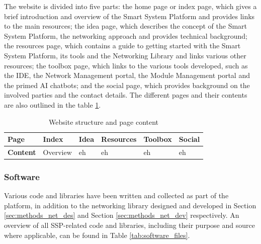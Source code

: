 The website is divided into five parts: the home page or index page, which gives a brief introduction and overview of the Smart System Platform and provides links to the main resources; the idea page, which describes the concept of the Smart System Platform, the networking approach and provides technical background; the resources page, which contains a guide to getting started with the Smart System Platform, its tools and the Networking Library and links various other resources; the toolbox page, which links to the various tools developed, such as the IDE, the Network Management portal, the Module Management portal and the primed AI chatbots; and the social page, which provides background on the involved parties and the contact details. The different pages and their contents are also outlined in the table \ref{tab:website_content}.

\begin{table}[H]
    \centering
    \begin{tabular}{|l||p{70pt}|p{70pt}|p{70pt}|p{70pt}|p{70pt}|}
        \hline
        \textbf{Page} & Index & Idea & Resources & Toolbox & Social \\\hline
        \textbf{Content} & Overview & eh & eh & eh & eh \\
    \end{tabular}
    \vspace{\ftspace}
    \caption{Website structure and page content}
    \label{tab:website_content}
\end{table}

\subsubsection{\label{sec:methods_sw}Software}

Various code and libraries have been written and collected as part of the platform, in addition to the networking library designed and developed in Section \ref{sec:methods_net_des} and Section \ref{sec:methods_net_dev} respectively. An overview of all SSP-related code and libraries, including their purpose and source where applicable, can be found in Table \ref{tab:software_files}.

